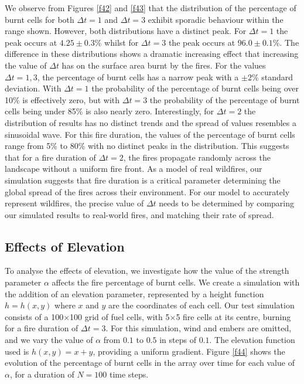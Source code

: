 \noindent We observe from Figures \ref{f42} and \ref{f43} that the distribution of the percentage of burnt cells for both $\Delta t=1$ and $\Delta t=3$ exhibit sporadic behaviour within the range shown. However, both distributions have a distinct peak. For $\Delta t=1$ the peak occurs at $4.25\pm0.3\%$ whilst for $\Delta t=3$ the peak occurs at $96.0\pm0.1\%$. \newline \indent The difference in these distributions shows a dramatic increasing effect that increasing the value of $\Delta t$ has on the surface area burnt by the fires. For the values $\Delta t=1,3$, the percentage of burnt cells has a narrow peak with a $\pm 2\%$ standard deviation. With $\Delta t=1$ the probability of the percentage of burnt cells being over 10\% is effectively zero, but with $\Delta t=3$ the probability of the percentage of burnt cells being under 85\% is also nearly zero. \newline \indent Interestingly, for $\Delta t=2$ the distribution of results has no distinct trends and the spread of values resembles a sinusoidal wave. For this fire duration, the values of the percentage of burnt cells range from 5\% to 80\% with no distinct peaks in the distribution. This suggests that for a fire duration of $\Delta t = 2$, the fires propagate randomly across the landscape without a uniform fire front. \newline \indent As a model of real wildfires, our simulation suggests that fire duration is a critical parameter determining the global spread of the fires across their environment. For our model to accurately represent wildfires, the precise value of $\Delta t$ needs to be determined by comparing our simulated results to real-world fires, and matching their rate of spread.

\subsection{Effects of Elevation}\label{4.2}

To analyse the effects of elevation, we investigate how the value of the strength parameter $\alpha$ affects the fire percentage of burnt cells. We create a simulation with the addition of an elevation parameter, represented by a height function $h=h(x,y)$ where $x$ and $y$ are the coordinates of each cell. Our test simulation consists of a 100$\times$100 grid of fuel cells, with 5$\times$5 fire cells at its centre, burning for a fire duration of $\Delta t = 3$. For this simulation, wind and embers are omitted, and we vary the value of $\alpha$ from $0.1$ to $0.5$ in steps of $0.1$. The elevation function used is $h(x,y)= x+y$, providing a uniform gradient. Figure \ref{f44} shows the evolution of the percentage of burnt cells in the array over time for each value of $\alpha$, for a duration of $N=100$ time steps.

